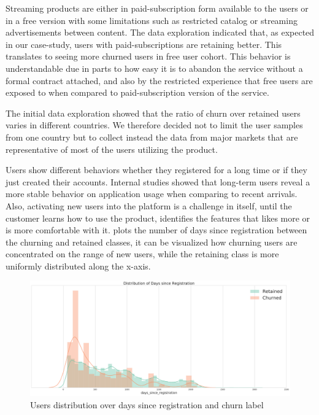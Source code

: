\documentclass{kththesis}
\begin{document}
Streaming products are either in paid-subscription form available to the users or in a free version with some limitations such as restricted catalog or streaming advertisements between content. The data exploration indicated that, as expected in our case-study, users with paid-subscriptions are retaining better. This translates to seeing more churned users in free user cohort. This behavior is understandable due in parts to how easy it is to abandon the service without a formal contract attached, and also by the restricted experience that free users are exposed to when compared to paid-subscription version of the service.

The initial data exploration showed that the ratio of churn over retained users varies in different countries. We therefore decided not to limit the user samples from one country but to collect instead the data from major markets that are representative of most of the users utilizing the product.

Users show different behaviors whether they registered for a long time or if they just created their accounts. Internal studies showed that long-term users reveal a more stable behavior on application usage when comparing to recent arrivals. Also, activating new users into the platform is a challenge in itself, until the customer learns how to use the product, identifies the features that likes more or is more comfortable with it.  plots the number of days since registration between the churning and retained classes, it can be visualized how churning users are concentrated on the range of new users, while the retaining class is more uniformly distributed along the x-axis.

	\begin{figure}[h]
    \centering
    \includegraphics[width=1.0\textwidth,keepaspectratio]{figures/days_since_reg.pdf}
    \caption{Users distribution over days since registration and churn label}
    \label{fig:dayssinceregdist}
	\end{figure}
\end{document}

